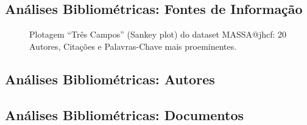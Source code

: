 \subsection{Análises Bibliométricas: Fontes de Informação}

\begin{figure}
    \centering
    \caption{Plotagem ``Três Campos'' (Sankey plot) do dataset MASSA@jhcf: 20 Autores, Citações e Palavras-Chave mais proeminentes.}
    \label{fig:MASSA@jhcf:ThreeFieldPlot}
\end{figure}

\subsection{Análises Bibliométricas: Autores}

\subsection{Análises Bibliométricas: Documentos}


